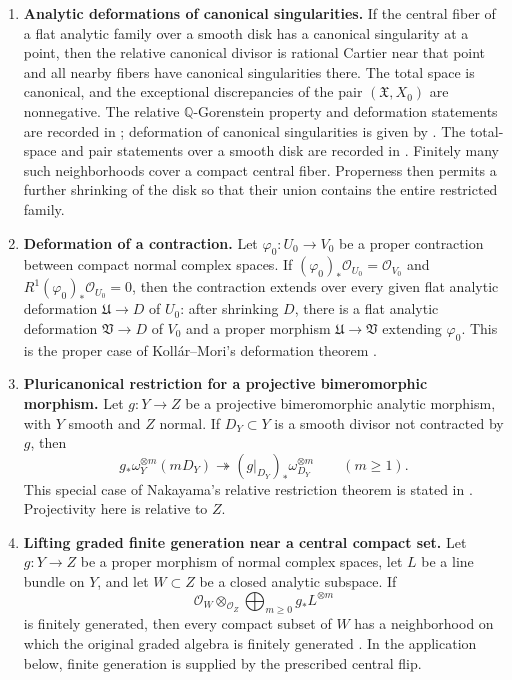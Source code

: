 \documentclass[11pt,a4paper]{article}
\theoremstyle{definition}\newtheorem{definition}[theorem]{Definition}
\theoremstyle{remark}\newtheorem*{remark}{Remark}
\newcommand{\Q}{\mathbb Q}\newcommand{\C}{\mathbb C}
\newcommand{\OO}{\mathcal O}
\begin{document}
\begin{enumerate}[label=\textbf{(A\arabic*)},leftmargin=*]
\item\label{an:canonical-deform}
\textbf{Analytic deformations of canonical singularities.}
If the central fiber of a flat analytic family over a smooth disk has a canonical
singularity at a point, then the relative canonical divisor is rational
Cartier near that point and all nearby fibers have canonical
singularities there. The total space is canonical,
and the exceptional discrepancies of the pair $(\mathfrak X,X_0)$
are nonnegative. The relative $\Q$-Gorenstein property and deformation
statements are recorded in \cite[Lemma~10]{Kollar2021}; deformation of
canonical singularities is given by \cite[VI.5.2]{Nakayama2004}.
The total-space and pair statements over a smooth disk are recorded in
\cite[Remark~10.3]{Kollar2021}. Finitely many such
neighborhoods cover a compact central fiber. Properness then permits
a further shrinking of the disk so that their union contains the
entire restricted family.

\item\label{an:contraction-deform}
\textbf{Deformation of a contraction.}
Let $\varphi_0:U_0\to V_0$ be a proper contraction between compact
normal complex spaces. If
$(\varphi_0)_*\OO_{U_0}=\OO_{V_0}$ and
$R^1(\varphi_0)_*\OO_{U_0}=0$, then the contraction extends over every
given flat analytic deformation $\mathfrak U\to D$ of $U_0$:
after shrinking $D$, there is a flat analytic deformation
$\mathfrak V\to D$ of $V_0$ and a proper morphism
$\mathfrak U\to\mathfrak V$ extending $\varphi_0$.
This is the proper case of Kollár--Mori's deformation theorem
\cite[Proposition~11.4, part~(11.4.1)]{KM1992}.

\item\label{an:relative-restriction}
\textbf{Pluricanonical restriction for a projective bimeromorphic morphism.}
Let $g:Y\to Z$ be a projective bimeromorphic analytic morphism, with
$Y$ smooth and $Z$ normal. If $D_Y\subset Y$ is a smooth divisor
not contracted by $g$, then
\begin{equation}\label{eq:nakayama-relative-restriction}
 g_*\omega_Y^{\otimes m}(mD_Y)
 \twoheadrightarrow(g|_{D_Y})_*\omega_{D_Y}^{\otimes m}
 \qquad(m\ge1).
\end{equation}
This special case of Nakayama's relative restriction theorem
\cite[VI.3.8]{Nakayama2004} is stated in
\cite[Theorem~9]{Kollar2021}. Projectivity here is relative to $Z$.

\item\label{an:finite-generation-lift}
\textbf{Lifting graded finite generation near a central compact set.}
Let $g:Y\to Z$ be a proper morphism of normal complex spaces, let
$L$ be a line bundle on $Y$, and let $W\subset Z$ be a closed
analytic subspace. If
\[
 \OO_W\otimes_{\OO_Z}\bigoplus_{m\ge0}g_*L^{\otimes m}
\]
is finitely generated, then every compact subset of $W$ has a
neighborhood on which the original graded algebra is finitely
generated \cite[Lemma~11]{Kollar2021}. In the application below,
finite generation is supplied by the prescribed central flip.
\end{enumerate}
\end{document}
